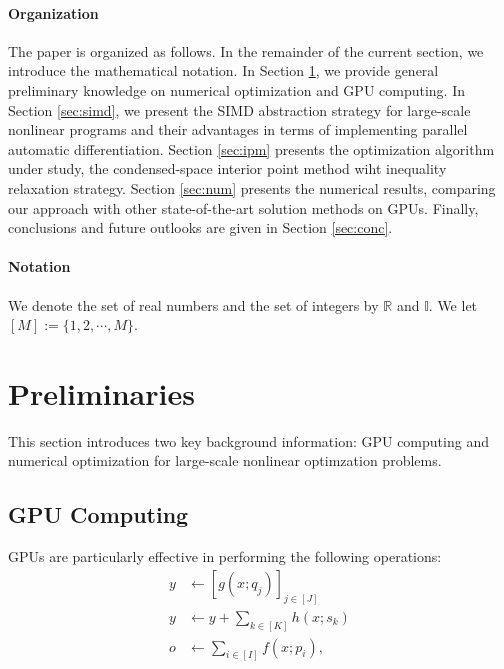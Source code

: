 \paragraph*{Organization} The paper is organized as follows. In the remainder of the current section, we introduce the mathematical notation. In Section \ref{sec:prelim}, we provide general preliminary knowledge on numerical optimization and GPU computing. In Section \ref{sec:simd}, we present the SIMD abstraction strategy for large-scale nonlinear programs and their advantages in terms of implementing parallel automatic differentiation. Section \ref{sec:ipm} presents the optimization algorithm under study, the condensed-space interior point method wiht inequality relaxation strategy. Section \ref{sec:num} presents the numerical results, comparing our approach with other state-of-the-art solution methods on GPUs. Finally, conclusions and future outlooks are given in Section \ref{sec:conc}.

\paragraph*{Notation}
We denote the set of real numbers and the set of integers by $\mathbb{R}$ and $\mathbb{I}$. We let $[M]:=\{1,2,\cdots,M\}$.

\section{Preliminaries}\label{sec:prelim}
This section introduces two key background information: GPU computing and numerical optimization for large-scale nonlinear optimzation problems. 

\subsection{GPU Computing}\label{sec:gpu}


GPUs are particularly effective in performing the following operations:
\begin{subequations}\label{eqn:pattern}
  \begin{align}
    y&\leftarrow \left[g(x; q_j)\right]_{j\in [J]}\\
    y&\leftarrow y + \sum_{k\in [K]} h(x;s_k)\\
    o&\leftarrow \sum_{i\in [I]} f(x; p_i),
  \end{align}
\end{subequations}


